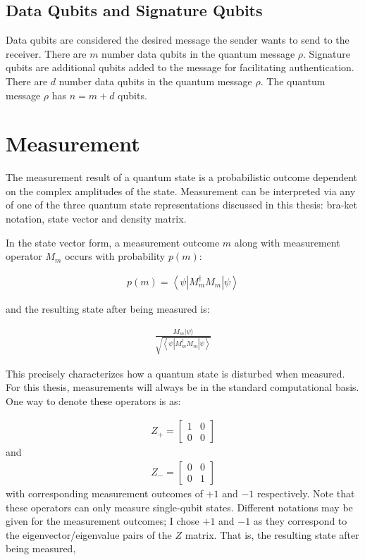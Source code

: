 \subsection{Data Qubits and Signature Qubits}
Data qubits are considered the desired message the sender wants to send to the receiver. There are $m$ number data qubits in the quantum message $\rho$. Signature qubits are additional qubits added to the message for facilitating authentication. There are $d$ number data qubits in the quantum message $\rho$. The quantum message $\rho$ has $n = m + d$ qubits.
\section{Measurement}
\label{subsec:Measurements}
The measurement result of a quantum state is a probabilistic outcome dependent on the complex amplitudes of the state. Measurement can be interpreted via any of one of the three quantum state representations discussed in this thesis: bra-ket notation, state vector and density matrix.

In the state vector form, a measurement outcome $m$ along with measurement operator $M_m$ occurs with probability $p(m)$:

\begin{align}
p(m)=\left\langle\psi\left|M_{m}^{\dagger} M_{m}\right| \psi\right\rangle
\end{align}

and the resulting state after being measured is:

\begin{align}
\frac{M_{m}|\psi\rangle}{\sqrt{\left\langle\psi\left|M_{m}^{\dagger} M_{m}\right| \psi\right\rangle}}
\end{align}

This precisely characterizes how a quantum state is disturbed when measured. For this thesis, measurements will always be in the standard computational basis. One way to denote these operators is as:

\begin{align}
Z_+ = \left[\begin{array}{ll}
1 & 0 \\
0 & 0
\end{array}\right]
\end{align}
and
\begin{align}
Z_- = \left[\begin{array}{ll}
0 & 0 \\
0 & 1
\end{array}\right]
\end{align}
with corresponding measurement outcomes of $+1$ and $-1$ respectively. Note that these operators can only measure single-qubit states. Different notations may be given for the measurement outcomes; I chose $+1$ and $-1$ as they correspond to the eigenvector/eigenvalue pairs of the $Z$ matrix. That is, the resulting state after being measured,

